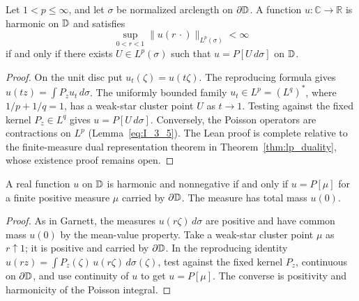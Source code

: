 \begin{theorem}
  \label{thm:I_3_5(a)}
  \leanok
  Let $1<p\le\infty$, and let $\sigma$ be normalized arclength on $\partial\mathbb{D}$.
  A function $u:\mathbb C\to\mathbb R$ is harmonic on $\mathbb{D}$ and satisfies
  \[
    \sup_{0<r<1}\|u(r\,\cdot)\|_{L^p(\sigma)}<\infty
  \]
  if and only if there exists $U\in L^p(\sigma)$ such that
  $u=P[U\,d\sigma]$ on $\mathbb{D}$.
  \begin{proof}
    \leanok
    On the unit disc put $u_t(\zeta)=u(t\zeta)$. The reproducing formula
    gives $u(tz)=\int P_z u_t\,d\sigma$. The uniformly bounded family
    $u_t\in L^p=(L^q)^*$, where $1/p+1/q=1$, has a weak-star cluster
    point $U$ as $t\to1$. Testing against the fixed kernel $P_z\in L^q$
    gives $u=P[U\,d\sigma]$. Conversely, the Poisson operators are
    contractions on $L^p$ (Lemma~\ref{eq:I_3_5}).
    The Lean proof is complete relative to the finite-measure dual representation
    theorem in Theorem~\ref{thm:lp_duality}, whose existence proof remains open.
  \end{proof}
\end{theorem}

\begin{theorem}
  \label{thm:I_3_5(c)}
  \leanok
  \mainline
  A real function $u$ on $\mathbb{D}$ is harmonic and nonnegative if and only if
  $u=P[\mu]$ for a finite positive measure $\mu$ carried by $\partial\mathbb{D}$.
  The measure has total mass $u(0)$.
  \begin{proof}
    \leanok
    As in Garnett, the measures $u(r\zeta)\,d\sigma$ are positive and
    have common mass $u(0)$ by the mean-value property. Take a weak-star
    cluster point $\mu$ as $r\uparrow1$; it is positive and carried by
    $\partial\mathbb{D}$. In the reproducing identity
    $u(rz)=\int P_z(\zeta)\,u(r\zeta)\,d\sigma(\zeta)$, test against the
    fixed kernel $P_z$, continuous on $\partial\mathbb{D}$, and use continuity of
    $u$ to get $u=P[\mu]$. The converse is positivity and harmonicity of
    the Poisson integral.
  \end{proof}
\end{theorem}

